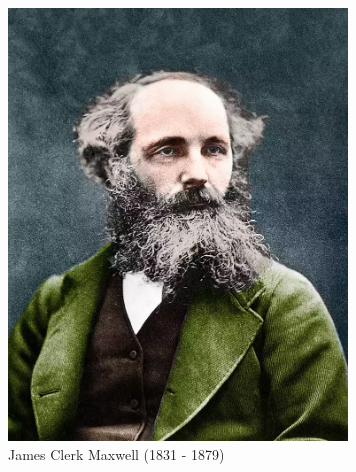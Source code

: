 \begin{figure}[h]
    \centering
        \includegraphics[width=9cm]{archivos/maxwell}
        \caption{James Clerk Maxwell (1831 - 1879) }
        \label{fig:maxwell}
\end{figure}

